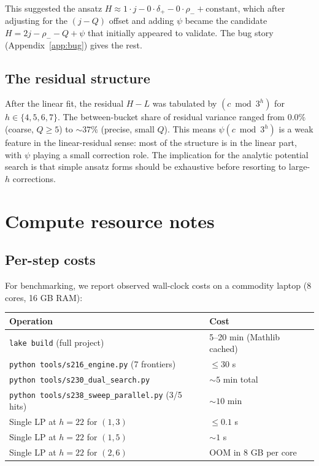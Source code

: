\documentclass[11pt,a4paper]{article}
\theoremstyle{plain}
\theoremstyle{definition}
\begin{document}
This suggested the ansatz
$H \approx 1 \cdot j - 0 \cdot \delta_+ - 0 \cdot \rho_-
   + \text{constant}$,
which after adjusting for the $(j - Q)$ offset and adding $\psi$
became the candidate $H = 2j - \rho_- - Q + \psi$ that initially
appeared to validate. The bug story (Appendix~\ref{app:bug}) gives
the rest.

\subsection{The residual structure}

After the linear fit, the residual $H - L$ was tabulated by
$(c \bmod 3^h)$ for $h \in \{4, 5, 6, 7\}$. The between-bucket
share of residual variance ranged from $0.0\%$ (coarse, $Q \ge 5$)
to $\sim 37\%$ (precise, small $Q$). This means $\psi(c \bmod 3^h)$
is a weak feature in the linear-residual sense: most of the
structure is in the linear part, with $\psi$ playing a small
correction role. The implication for the analytic potential search
is that simple ansatz forms should be exhaustive before resorting
to large-$h$ corrections.

\section{Compute resource notes}\label{app:compute}

\subsection{Per-step costs}

For benchmarking, we report observed wall-clock costs on a
commodity laptop (8 cores, 16 GB RAM):

\begin{center}\footnotesize
\begin{tabular}{ll}
\toprule
Operation & Cost \\
\midrule
\texttt{lake build} (full project) & 5--20 min (Mathlib cached) \\
\texttt{python tools/s216\_engine.py} (7 frontiers) & ${\le} 30$ s \\
\texttt{python tools/s230\_dual\_search.py} & ${\sim}5$ min total \\
\texttt{python tools/s238\_sweep\_parallel.py} (3/5 hits) & ${\sim}10$ min \\
Single LP at $h = 22$ for $(1, 3)$ & ${\le}0.1$ s \\
Single LP at $h = 22$ for $(1, 5)$ & ${\sim}1$ s \\
Single LP at $h = 22$ for $(2, 6)$ & OOM in $8$ GB per core \\
\bottomrule
\end{tabular}
\end{center}
\end{document}
